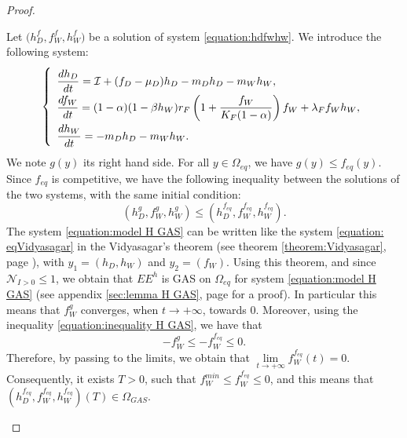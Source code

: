\documentclass{article}
\newcommand{\lfw}{\lambda_{F}}
\newcommand{\lfw}{\lambda_{F}}
\newcommand{\cI}{\mathcal{I}}
\newcommand{\N}{\mathcal{N}}
\theoremstyle{definition}
\theoremstyle{remark}
\begin{document}
\begin{proof}
\begin{itemize}
{Let $\Big(h_D^f, f_W^f, h_W^f \Big)$ be a solution of system \eqref{equation:hdfwhw}. We introduce the following system:
\begin{equation}
\def\arraystretch{2}
\left\lbrace \begin{array}{l}
\dfrac{dh_D}{dt}= \cI + (f_D - \mu_D) h_D - m_D h_D - m_W h_W, \\
\dfrac{df_W}{dt} = (1-\alpha)(1 - \beta h_W) r_F \left(1 + \dfrac{f_W}{K_F(1-\alpha)} \right) f_W + \lfw f_W h_W, \\
\dfrac{dh_W}{dt}= -m_D h_D - m_W h_W. 
\end{array} \right.
\label{equation:model H GAS}
\end{equation}
We note $g(y)$ its right hand side. For all $y \in \Omega_{eq}$, we have $g(y) \leq f_{eq}(y)$. Since $f_{eq}$ is competitive, we have the following inequality between the solutions of the two systems, with the same initial condition:
\begin{equation}
(h_D^g,f_W^g, h_W^g) \leq (h_D^{f_{eq}},f_W^{f_{eq}}, h_W^{f_{eq}}).
\label{equation:inequality H GAS}
\end{equation}
The system \eqref{equation:model H GAS} can be written like the system \eqref{equation: eqVidyasagar} in the Vidyasagar's theorem (see theorem \ref{theorem:Vidyasagar}, page \pageref{theorem:Vidyasagar}), with $y_1 = (h_D, h_W)$ and $y_2 = (f_W)$. Using this theorem, and since $\N_{I>0} \leq 1$, we obtain that $EE^{h}$ is GAS on $\Omega_{eq}$ for system \eqref{equation:model H GAS} (see appendix \ref{sec:lemma H GAS}, page \pageref{sec:lemma H GAS} for a proof). In particular this means that $f_W^g$ converges, when $t\rightarrow +\infty$, towards $0$.
Moreover, using the inequality \eqref{equation:inequality H GAS}, we have that 
$$
-f_W^g \leq -f_W^{f_{eq}} \leq 0.
$$
Therefore, by passing to the limits, we obtain that $\lim\limits_{t\rightarrow +\infty}f_W^{f_{eq}}(t) = 0$.
Consequently, it exists $T > 0$, such that $f_W^{min} \leq f_W^{f_{eq}} \leq 0 $, and this means that $(h_D^{f_{eq}},f_W^{f_{eq}}, h_W^{f_{eq}})(T) \in \Omega_{GAS}$.}
\end{itemize}
\end{proof}
\end{document}
